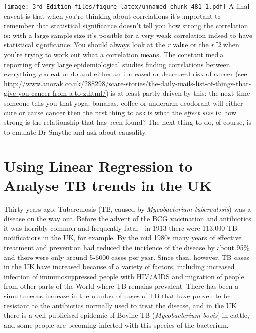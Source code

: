 \documentclass[
]{book}
\begin{document}
\texttt{[image: 3rd\_Edition\_files/figure-latex/unnamed-chunk-481-1.pdf]}
A final caveat is that when you're thinking about correlations it's important to remember that statistical significance doesn't tell you how strong the correlation is: with a large sample size it's possible for a very weak correlation indeed to have statistical significance. You should always look at the \emph{r} value or the \emph{r\^{}2} when you're trying to work out what a correlation means. The constant media reporting of very large epidemiological studies finding correlations between everything you eat or do and either an increased or decreased risk of cancer (see \url{http://www.anorak.co.uk/288298/scare-stories/the-daily-mails-list-of-things-that-give-you-cancer-from-a-to-z.html/}) is at least partly driven by this: the next time someone tells you that yoga, bananas, coffee or underarm deodorant will either cure or cause cancer then the first thing to ask is what the \emph{effect size} is: how strong is the relationship that has been found? The next thing to do, of course, is to emulate Dr Smythe and ask about causality.

\hypertarget{using-linear-regression-to-analyse-tb-trends-in-the-uk}{%
\chapter{Using Linear Regression to Analyse TB trends in the UK}\label{using-linear-regression-to-analyse-tb-trends-in-the-uk}}

Thirty years ago, Tuberculosis (TB, caused by \emph{Mycobacterium tuberculosis}) was a disease on the way out. Before the advent of the BCG vaccination and antibiotics it was horribly common and frequently fatal - in 1913 there were 113,000 TB notifications in the UK, for example. By the mid 1980s many years of effective treatment and prevention had reduced the incidence of the disease by about 95\% and there were only around 5-6000 cases per year. Since then, however, TB cases in the UK have increased because of a variety of factors, including increased infection of immunosuppressed people with HIV/AIDS and migration of people from other parts of the World where TB remains prevalent. There has been a simultaneous increase in the number of cases of TB that have proven to be resistant to the antibiotics normally used to treat the disease, and in the UK there is a well-publicised epidemic of Bovine TB (\emph{Mycobacterium bovis}) in cattle, and some people are becoming infected with this species of the bacterium.
\end{document}
